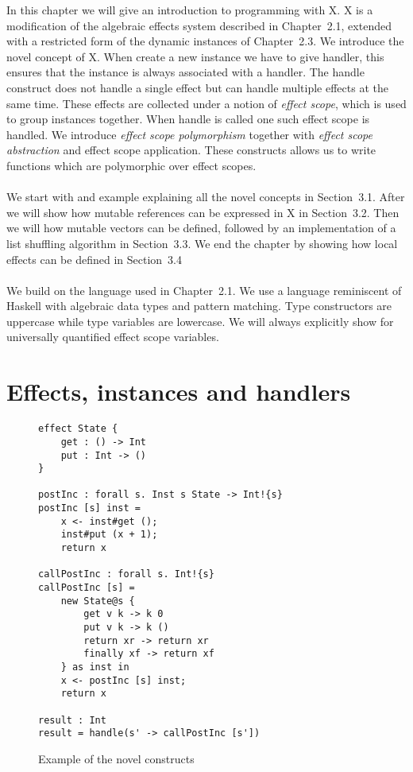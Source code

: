 \iffalse
\fi

In this chapter we will give an introduction to programming with X.
X is a modification of the algebraic effects system described in Chapter~2.1, extended with a restricted form of the dynamic instances of Chapter~2.3.
We introduce the novel concept of X.
When create a new instance we have to give handler, this ensures that the instance is always associated with a handler.
The handle construct does not handle a single effect but can handle multiple effects at the same time.
These effects are collected under a notion of \emph{effect scope}, which is used to group instances together.
When handle is called one such effect scope is handled.
We introduce \emph{effect scope polymorphism} together with \emph{effect scope abstraction} and {effect scope application}.
These constructs allows us to write functions which are polymorphic over effect scopes.
\\\\
We start with and example explaining all the novel concepts in Section~3.1.
After we will show how mutable references can be expressed in X in Section~3.2.
Then we will how mutable vectors can be defined, followed by an implementation of a list shuffling algorithm in Section~3.3.
We end the chapter by showing how local effects can be defined in Section~3.4
\\\\
We build on the language used in Chapter~2.1.
We use a language reminiscent of Haskell with algebraic data types and pattern matching.
Type constructors are uppercase while type variables are lowercase.
We will always explicitly show  for universally quantified effect scope variables.

\section{Effects, instances and handlers}
\label{basics}

\begin{figure}
\caption{Example of the novel constructs}
\begin{verbatim}
effect State {
	get : () -> Int
	put : Int -> ()
}

postInc : forall s. Inst s State -> Int!{s}
postInc [s] inst =
	x <- inst#get ();
	inst#put (x + 1);
	return x

callPostInc : forall s. Int!{s}
callPostInc [s] =
	new State@s {
		get v k -> k 0
		put v k -> k ()
		return xr -> return xr
		finally xf -> return xf
	} as inst in
	x <- postInc [s] inst;
	return x

result : Int
result = handle(s' -> callPostInc [s'])
\end{verbatim}
\label{fig:example1}
\end{figure}


